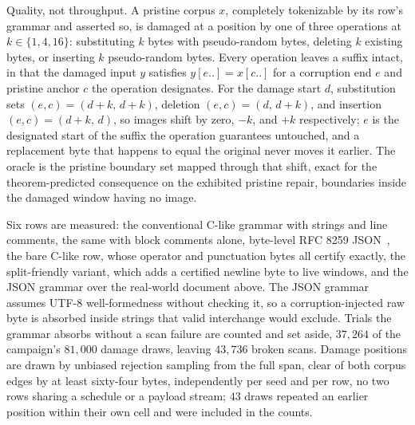 \documentclass[11pt,a4paper]{article}
\theoremstyle{definition}
\theoremstyle{plain}
\theoremstyle{remark}
\begin{document}
Quality, not throughput. A pristine corpus $x$, completely tokenizable by its row's grammar and asserted so, is damaged
at a position by one of three operations at $k \in \{1,4,16\}$: substituting $k$ bytes with pseudo-random bytes,
deleting $k$ existing bytes, or inserting $k$ pseudo-random bytes. Every operation leaves a suffix intact, in that the
damaged input $y$ satisfies $y[e..] = x[c..]$ for a corruption end $e$ and pristine anchor $c$ the operation designates.
For the damage start $d$, substitution sets $(e, c) = (d+k,\, d+k)$, deletion $(e, c) = (d,\, d+k)$, and insertion
$(e, c) = (d+k,\, d)$, so images shift by zero, $-k$, and $+k$ respectively; $e$ is the designated start of the suffix
the operation guarantees untouched, and a replacement byte that happens to equal the original never moves it earlier.
The oracle is the pristine boundary set mapped through that shift, exact for the theorem-predicted consequence on the
exhibited pristine repair, boundaries inside the damaged window having no image.

Six rows are measured: the conventional C-like grammar with strings and line comments, the same with block comments
alone, byte-level RFC 8259 JSON~\citep{rfc8259}, the bare C-like row, whose operator and punctuation bytes all certify
exactly, the split-friendly variant, which adds a certified newline byte to live windows, and the JSON grammar over the
real-world document above. The JSON grammar assumes UTF-8 well-formedness without checking it, so a corruption-injected
raw byte is absorbed inside strings that valid interchange would exclude. Trials the grammar absorbs without a scan
failure are counted and set aside, $37{,}264$ of the campaign's $81{,}000$ damage draws, leaving $43{,}736$ broken
scans. Damage positions are drawn by unbiased rejection sampling from the full span, clear of both corpus edges by at
least sixty-four bytes, independently per seed and per row, no two rows sharing a schedule or a payload stream; $43$
draws repeated an earlier position within their own cell and were included in the counts.
\end{document}
